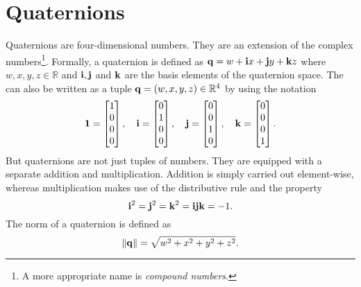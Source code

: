 	\section{Quaternions}
		Quaternions are four-dimensional numbers.
		They are an extension of the complex numbers\footnote{A more appropriate name is \emph{compound numbers}.}.
		Formally, a quaternion is defined as $\mathbf{q} = w + \mathbf{i}x + \mathbf{j}y + \mathbf{k}z$ where $w, x, y, z \in \mathbb{R}$ and $\mathbf{i},\mathbf{j}$ and $\mathbf{k}$ are the basis elements of the quaternion space.
		The  can also be written as a tuple $\mathbf{q} = (w, x, y, z) \in \mathbb{R}^4$ by using the notation
		\begin{equation}
			\mathbf{1} = 
			\begin{bmatrix}
				1 \\ 
				0 \\ 
				0 \\ 
				0
			\end{bmatrix},\quad
			\mathbf{i} = 
			\begin{bmatrix}
				0 \\ 
				1 \\ 
				0 \\ 
				0
			\end{bmatrix},\quad
			\mathbf{j} = 
			\begin{bmatrix}
				0 \\ 
				0 \\ 
				1 \\ 
				0
			\end{bmatrix},\quad
			\mathbf{k} =
			\begin{bmatrix}
				0 \\ 
				0 \\ 
				0 \\ 
				1
			\end{bmatrix}.
		\end{equation}
		But quaternions are not just tuples of numbers. 
		They are equipped with a separate addition and multiplication.
		Addition is simply carried out element-wise, whereas multiplication makes use of the distributive rule and the property
		\begin{equation}
			\mathbf{i}^2 = \mathbf{j}^2 = \mathbf{k}^2 = \mathbf{i}\mathbf{j}\mathbf{k} = -1.
		\end{equation}
		The norm of a quaternion is defined as
		\begin{equation}
			\lVert \mathbf{q} \rVert = \sqrt{w^2 + x^2 + y^2 + z^2}.
		\end{equation}
		
